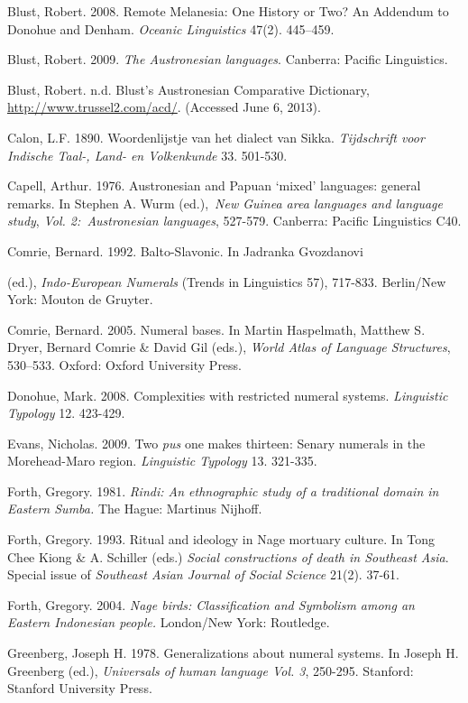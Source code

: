 Blust, Robert. 2008. Remote Melanesia: One History or Two? An Addendum to Donohue and Denham. \textit{Oceanic Linguistics} 47(2). 445{}--459.

Blust, Robert. 2009. \textit{The Austronesian languages}. Canberra: Pacific Linguistics.

Blust, Robert. n.d. Blust{\textquoteright}s Austronesian Comparative Dictionary, \url{http://www.trussel2.com/acd/}. (Accessed June 6, 2013). 

Calon, L.F. 1890. Woordenlijstje van het dialect van Sikka. \textit{Tijdschrift voor Indische Taal-, Land- en Volkenkunde} 33. 501-530.

Capell, Arthur. 1976. Austronesian and Papuan {\textquoteleft}mixed{\textquoteright} languages: general remarks. In Stephen A. Wurm (ed.),~\textit{New Guinea area languages and language study}, \textit{Vol. 2:}\textit{~}\textit{Austronesian languages}, 527-579. Canberra: Pacific Linguistics C40.

Comrie, Bernard. 1992. Balto-Slavonic. In Jadranka Gvozdanovi

 (ed.), \textit{Indo-European Numerals }(Trends in Linguistics 57), 717-833. Berlin/New York: Mouton de Gruyter.

Comrie, Bernard. 2005. Numeral bases. In Martin Haspelmath, Matthew S. Dryer, Bernard Comrie \& David Gil (eds.), \textit{World Atlas of Language Structures}, 530{}--533. Oxford: Oxford University Press. 

Donohue, Mark. 2008. Complexities with restricted numeral systems. \textit{Linguistic Typology }12. 423-429. 

Evans, Nicholas. 2009. Two \textit{pus }one makes thirteen: Senary numerals in the Morehead-Maro region. \textit{Linguistic Typology }13. 321-335.

Forth, Gregory. 1981. \textit{Rindi: An ethnographic study of a traditional domain in Eastern Sumba. }The Hague: Martinus Nijhoff.

Forth, Gregory. 1993. Ritual and ideology in Nage mortuary culture. In Tong Chee Kiong \& A. Schiller (eds.) \textit{Social constructions of death in Southeast Asia}. Special issue of \textit{Southeast Asian Journal of Social} \textit{Science} 21(2). 37-61.

Forth, Gregory. 2004. \textit{Nage birds: Classification and Symbolism among an Eastern Indonesian people. }London/New York: Routledge. 

Greenberg, Joseph H. 1978. Generalizations about numeral systems. In Joseph H. Greenberg (ed.), \textit{Universals of human language Vol. 3}, 250-295. Stanford: Stanford University Press.

